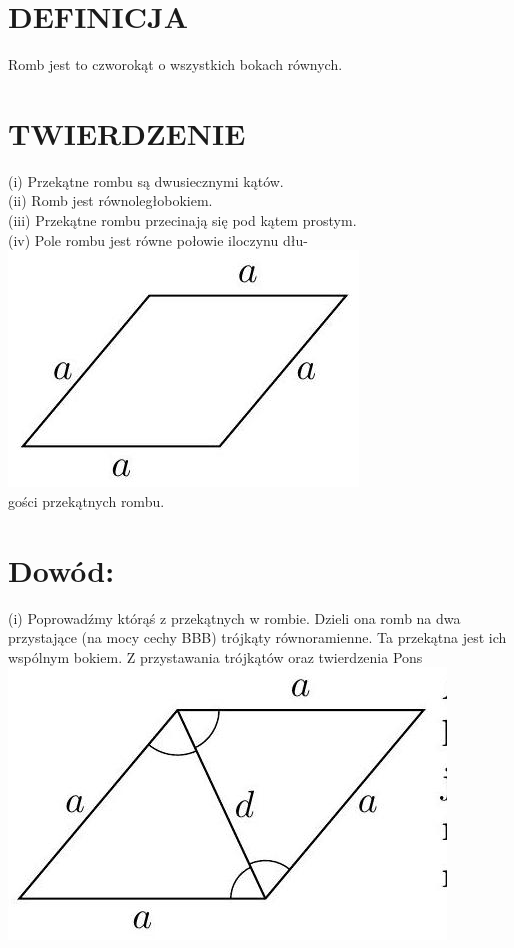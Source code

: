 \documentclass[10pt]{article}
\begin{document}
\section*{DEFINICJA}
Romb jest to czworokąt o wszystkich bokach równych.

\section*{TWIERDZENIE}
(i) Przekątne rombu są dwusiecznymi kątów.\\
(ii) Romb jest równoległobokiem.\\
(iii) Przekątne rombu przecinają się pod kątem prostym.\\
(iv) Pole rombu jest równe połowie iloczynu dłu-\\
\includegraphics[max width=\textwidth, center]{2024_11_21_71f62bd117d375398909g-139(1)}\\
gości przekątnych rombu.

\section*{Dowód:}
(i) Poprowadźmy którąś z przekątnych w rombie. Dzieli ona romb na dwa przystające (na mocy cechy BBB) trójkąty równoramienne. Ta przekątna jest ich wspólnym bokiem. Z przystawania trójkątów oraz twierdzenia Pons\\
\includegraphics[max width=\textwidth, center]{2024_11_21_71f62bd117d375398909g-139}
\end{document}
